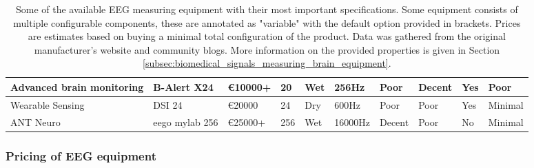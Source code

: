 \begin{table}
{\begin{tabular}{|l|l|l|l|l|l|l|l|l|l|}
        Advanced brain monitoring & B-Alert X24      & €10000+                 & 20                       & Wet                     & 256Hz                       & Poor                        & Decent                   & Yes               & Poor                    \\ \hline
        Wearable Sensing          & DSI 24           & €20000                  & 24                       & Dry                     & 600Hz                       & Poor                        & Poor                     & Yes               & Minimal                 \\ \hline
        ANT Neuro                 & eego mylab 256   & €25000+                 & 256                      & Wet                     & 16000Hz                     & Decent                      & Poor                     & No                & Minimal                 \\ \hline
        \end{tabular}%
        }
    \captionsetup{width=0.9\linewidth}
    \captionsetup{justification=centering}
    \caption{Some of the available EEG measuring equipment with their most important specifications. Some equipment consists of multiple configurable components, these are annotated as "variable" with the default option provided in brackets. Prices are estimates based on buying a minimal total configuration of the product. Data was gathered from the original manufacturer's website and community blogs. More information on the provided properties is given in Section \ref{subsec:biomedical_signals_measuring_brain_equipment}.}
    \label{tab:biomedical_signals_eeg_equipment}
\end{table}
\endgroup



\subsubsection{Pricing of EEG equipment}
\label{subsubsec:biomedical_signals_measuring_brain_equipment_pricing}


